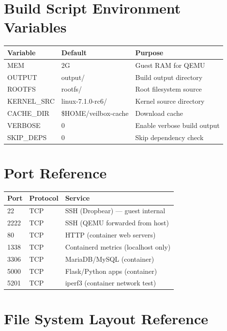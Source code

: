 \section{Build Script Environment Variables}

\begin{longtable}{|p{4cm}|p{4cm}|p{5cm}|}
\hline
\textbf{Variable} & \textbf{Default} & \textbf{Purpose} \\
\hline
MEM & 2G & Guest RAM for QEMU \\
OUTPUT & output/ & Build output directory \\
ROOTFS & rootfs/ & Root filesystem source \\
KERNEL\_SRC & linux-7.1.0-rc6/ & Kernel source directory \\
CACHE\_DIR & \$HOME/veilbox-cache & Download cache \\
VERBOSE & 0 & Enable verbose build output \\
SKIP\_DEPS & 0 & Skip dependency check \\
\hline
\end{longtable}

\section{Port Reference}

\begin{longtable}{|p{3cm}|p{3cm}|p{6cm}|}
\hline
\textbf{Port} & \textbf{Protocol} & \textbf{Service} \\
\hline
22 & TCP & SSH (Dropbear) — guest internal \\
2222 & TCP & SSH (QEMU forwarded from host) \\
80 & TCP & HTTP (container web servers) \\
1338 & TCP & Containerd metrics (localhost only) \\
3306 & TCP & MariaDB/MySQL (container) \\
5000 & TCP & Flask/Python apps (container) \\
5201 & TCP & iperf3 (container network test) \\
\hline
\end{longtable}

\section{File System Layout Reference}

